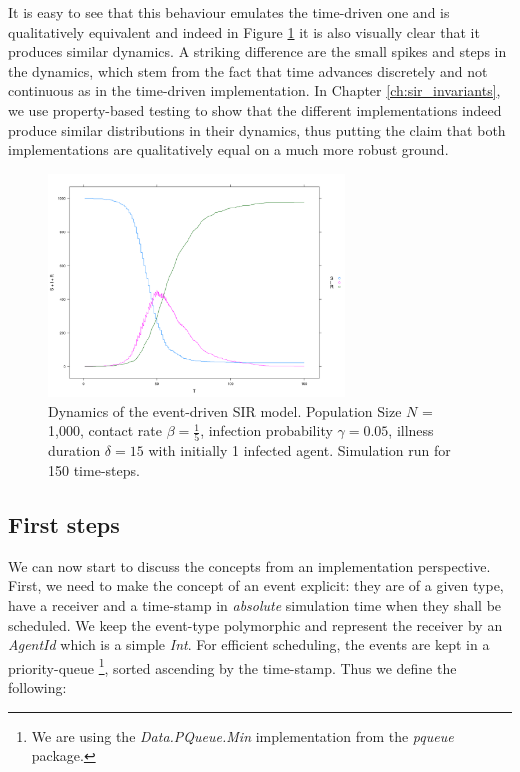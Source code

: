 \medskip

It is easy to see that this behaviour emulates the time-driven one and is qualitatively equivalent and indeed in Figure \ref{fig:sir_eventdriven_dynamics} it is also visually clear that it produces similar dynamics. A striking difference are the small spikes and steps in the dynamics, which stem from the fact that time advances discretely and not continuous as in the time-driven implementation. In Chapter \ref{ch:sir_invariants}, we use property-based testing to show that the different implementations indeed produce similar distributions in their dynamics, thus putting the claim that both implementations are qualitatively equal on a much more robust ground.

\begin{figure}
	\centering
	\includegraphics[width=0.7\textwidth, angle=0]{./fig/eventdriven/sir_eventdriven.png}
	\caption{Dynamics of the event-driven SIR model. Population Size $N$ = 1,000, contact rate $\beta = \frac{1}{5}$, infection probability $\gamma = 0.05$, illness duration $\delta = 15$ with initially 1 infected agent. Simulation run for 150 time-steps.}
	\label{fig:sir_eventdriven_dynamics}
\end{figure}

\subsection{First steps}
We can now start to discuss the concepts from an implementation perspective. First, we need to make the concept of an event explicit: they are of a given type, have a receiver and a time-stamp in \textit{absolute} simulation time when they shall be scheduled. We keep the event-type polymorphic and represent the receiver by an \textit{AgentId} which is a simple \textit{Int}. For efficient scheduling, the events are kept in a priority-queue \footnote{We are using the \textit{Data.PQueue.Min} implementation from the \textit{pqueue} package.}, sorted ascending by the time-stamp. Thus we define the following:


